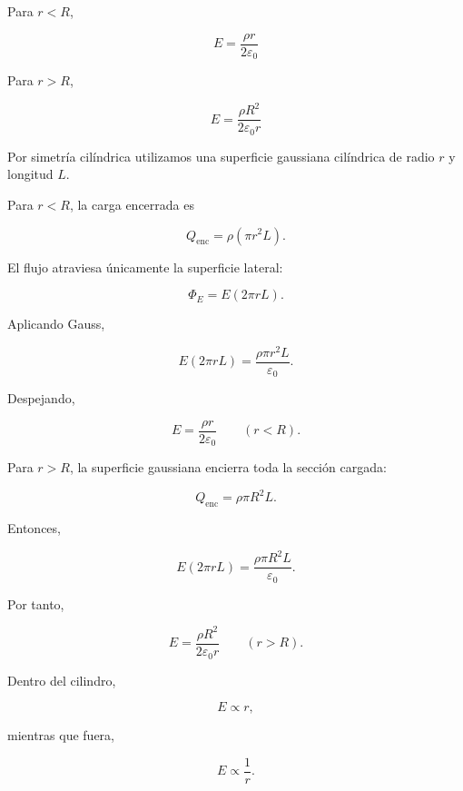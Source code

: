 \begin{respuesta}

Para \(r<R\),

\[
\boxed{
E=\frac{\rho r}{2\varepsilon_0}
}
\]

Para \(r>R\),

\[
\boxed{
E=\frac{\rho R^2}{2\varepsilon_0r}
}
\]

\end{respuesta}

\begin{explicacion}

Por simetría cilíndrica utilizamos una superficie gaussiana cilíndrica de radio
\(r\) y longitud \(L\).

Para \(r<R\), la carga encerrada es

\[
Q_{\text{enc}}
=
\rho(\pi r^2L).
\]

El flujo atraviesa únicamente la superficie lateral:

\[
\Phi_E=E(2\pi rL).
\]

Aplicando Gauss,

\[
E(2\pi rL)
=
\frac{\rho\pi r^2L}{\varepsilon_0}.
\]

Despejando,

\[
\boxed{
E=\frac{\rho r}{2\varepsilon_0}
\qquad(r<R)
}.
\]

Para \(r>R\), la superficie gaussiana encierra toda la sección cargada:

\[
Q_{\text{enc}}
=
\rho\pi R^2L.
\]

Entonces,

\[
E(2\pi rL)
=
\frac{\rho\pi R^2L}{\varepsilon_0}.
\]

Por tanto,

\[
\boxed{
E=\frac{\rho R^2}{2\varepsilon_0r}
\qquad(r>R)
}.
\]

Dentro del cilindro,

\[
E\propto r,
\]

mientras que fuera,

\[
E\propto\frac1r.
\]

\end{explicacion}


